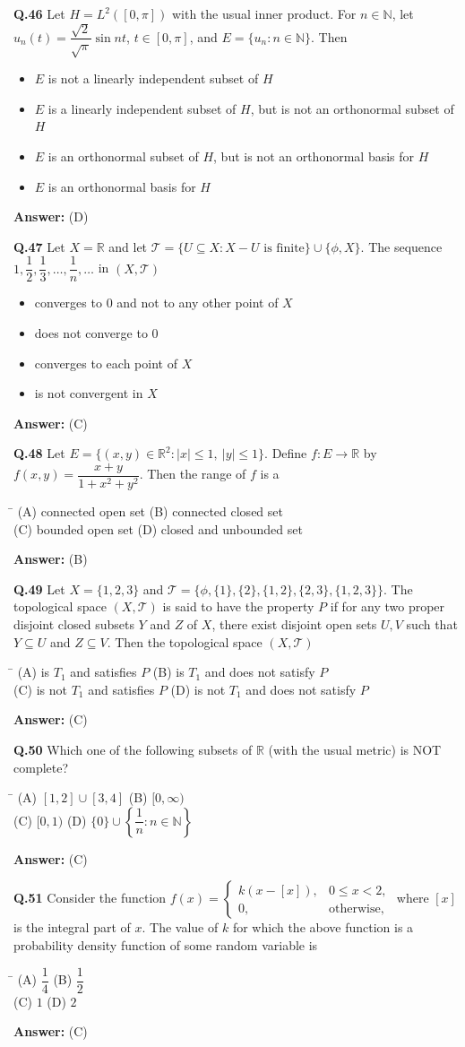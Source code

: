 \documentclass[11pt,a4paper]{article}
\newcommand{\optsfourA}[4]{%
  \begin{tabbing}
    \hspace{0.48\linewidth}\=\kill
    (A) #1 \> (B) #2 \\[2pt]
    (C) #3 \> (D) #4
  \end{tabbing}%
}
\newcommand{\optslistA}[4]{%
  \begin{itemize}
    \setlength{\itemsep}{2pt}\setlength{\parskip}{0pt}
    \item[(A)] #1
    \item[(B)] #2
    \item[(C)] #3
    \item[(D)] #4
  \end{itemize}%
}
\newcommand{\ans}[1]{\textbf{Answer:} #1\par\medskip}
\begin{document}
\textbf{Q.46} Let $H = L^2([0, \pi])$ with the usual inner product. For $n \in \mathbb{N}$, let $u_n(t) = \dfrac{\sqrt{2}}{\sqrt{\pi}}\sin nt$, $t \in [0, \pi]$, and $E = \{u_n : n \in \mathbb{N}\}$. Then
\optslistA{$E$ is not a linearly independent subset of $H$}{$E$ is a linearly independent subset of $H$, but is not an orthonormal subset of $H$}{$E$ is an orthonormal subset of $H$, but is not an orthonormal basis for $H$}{$E$ is an orthonormal basis for $H$}
\ans{(D)}

\textbf{Q.47} Let $X = \mathbb{R}$ and let $\mathcal{T} = \{U \subseteq X : X - U \text{ is finite}\} \cup \{\phi, X\}$. The sequence $1, \dfrac{1}{2}, \dfrac{1}{3}, \dots, \dfrac{1}{n}, \dots$ in $(X, \mathcal{T})$
\optslistA{converges to $0$ and not to any other point of $X$}{does not converge to $0$}{converges to each point of $X$}{is not convergent in $X$}
\ans{(C)}

\textbf{Q.48} Let $E = \{(x,y) \in \mathbb{R}^2 : |x| \le 1,\ |y| \le 1\}$. Define $f : E \to \mathbb{R}$ by $f(x,y) = \dfrac{x + y}{1 + x^2 + y^2}$. Then the range of $f$ is a
\optsfourA{connected open set}{connected closed set}{bounded open set}{closed and unbounded set}
\ans{(B)}

\textbf{Q.49} Let $X = \{1, 2, 3\}$ and $\mathcal{T} = \{\phi, \{1\}, \{2\}, \{1,2\}, \{2,3\}, \{1,2,3\}\}$. The topological space $(X, \mathcal{T})$ is said to have the property $P$ if for any two proper disjoint closed subsets $Y$ and $Z$ of $X$, there exist disjoint open sets $U, V$ such that $Y \subseteq U$ and $Z \subseteq V$. Then the topological space $(X, \mathcal{T})$
\optsfourA{is $T_1$ and satisfies $P$}{is $T_1$ and does not satisfy $P$}{is not $T_1$ and satisfies $P$}{is not $T_1$ and does not satisfy $P$}
\ans{(C)}

\textbf{Q.50} Which one of the following subsets of $\mathbb{R}$ (with the usual metric) is NOT complete?
\optsfourA{$[1, 2] \cup [3, 4]$}{$[0, \infty)$}{$[0, 1)$}{$\{0\} \cup \left\{\dfrac{1}{n} : n \in \mathbb{N}\right\}$}
\ans{(C)}

\textbf{Q.51} Consider the function $f(x) = \begin{cases} k(x - [x]), & 0 \le x < 2, \\ 0, & \text{otherwise,} \end{cases}$ where $[x]$ is the integral part of $x$. The value of $k$ for which the above function is a probability density function of some random variable is
\optsfourA{$\dfrac{1}{4}$}{$\dfrac{1}{2}$}{$1$}{$2$}
\ans{(C)}
\end{document}
